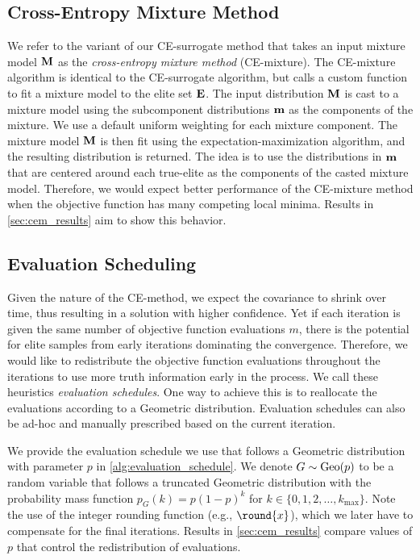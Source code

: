 


\subsection{Cross-Entropy Mixture Method} \label{sec:cem_alg_ce_mixture}
We refer to the variant of our CE-surrogate method that takes an input mixture model $\mathbf{M}$ as the \textit{cross-entropy mixture method} (CE-mixture).
The CE-mixture algorithm is identical to the CE-surrogate algorithm, but calls a custom  function to fit a mixture model to the elite set $\mathbf{E}$.
The input distribution $\mathbf{M}$ is cast to a mixture model using the subcomponent distributions $\mathbf{m}$ as the components of the mixture.
We use a default uniform weighting for each mixture component.
The mixture model $\mathbf{M}$ is then fit using the expectation-maximization algorithm, and the resulting distribution is returned.
The idea is to use the distributions in $\mathbf{m}$ that are centered around each true-elite as the components of the casted mixture model.
Therefore, we would expect better performance of the CE-mixture method when the objective function has many competing local minima.
Results in \cref{sec:cem_results} aim to show this behavior.



\subsection{Evaluation Scheduling} \label{sec:cem_alg_eval_schedule}
Given the nature of the CE-method, we expect the covariance to shrink over time, thus resulting in a solution with higher confidence.
Yet if each iteration is given the same number of objective function evaluations $m$, there is the potential for elite samples from early iterations dominating the convergence.
Therefore, we would like to redistribute the objective function evaluations throughout the iterations to use more truth information early in the process.
We call these heuristics \textit{evaluation schedules}.
One way to achieve this is to reallocate the evaluations according to a Geometric distribution.
Evaluation schedules can also be ad-hoc and manually prescribed based on the current iteration.

We provide the evaluation schedule we use that follows a Geometric distribution with parameter $p$ in \cref{alg:evaluation_schedule}.
We denote $G \sim \operatorname{Geo}(p)$ to be a random variable that follows a truncated Geometric distribution with the probability mass function $p_G(k) = p(1 - p)^k$ for $k \in \{0, 1, 2, \ldots, k_\text{max}\}$. %
Note the use of the integer rounding function (e.g., $\round{x}$), which we later have to compensate for the final iterations.
Results in \cref{sec:cem_results} compare values of $p$ that control the redistribution of evaluations.

